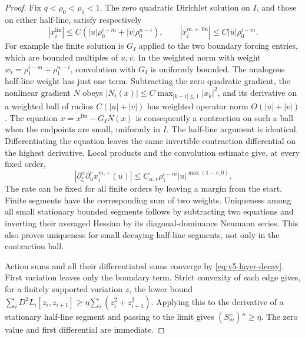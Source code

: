 \begin{proof}
Fix $q<\rho_0<\rho_1<1$. The zero quadratic Dirichlet solution on
$I$, and those on either half-line, satisfy respectively
\[
 |x_i^{\mathrm{lin}}|\le C(|u|\rho_0^{i-m}+|v|\rho_0^{n-i}),
 \qquad |x_i^{m,+,\mathrm{lin}}|\le C|u|\rho_0^{i-m}.
\]
For example the finite solution is $G_I$ applied to the two boundary
forcing entries, which are bounded multiples of $u,v$.
In the weighted norm with weight
$w_i=\rho_1^{i-m}+\rho_1^{n-i}$, convolution with $G_I$ is uniformly
bounded. The analogous half-line weight has just one term. Subtracting
the zero quadratic gradient, the nonlinear gradient $N$ obeys
$|N_i(x)|\le C\max_{|k-i|\le1}|x_k|^2$, and its derivative on a
weighted ball of radius $C(|u|+|v|)$ has weighted operator norm
$O(|u|+|v|)$. The equation
$x=x^{\mathrm{lin}}-G_I N(x)$ is consequently a contraction on such
a ball when the endpoints are small, uniformly in $I$. The half-line
argument is identical. Differentiating the equation leaves the same
invertible contraction differential on the highest derivative.
Local products and the convolution estimate give, at every fixed order,
\begin{equation}\label{eq:v5-layer-decay}
 |\partial_\xi^\alpha\partial_u^r x_i^{m,+}(u)|
 \le C_{\alpha,r}\rho_1^{i-m}|u|^{\max(1-r,0)}.
\end{equation}
The rate can be fixed for all finite orders by leaving a margin from
the start. Finite segments have the corresponding sum of two weights.
Uniqueness among all small stationary bounded segments follows by
subtracting two equations and inverting their averaged Hessian by
its diagonal-dominance Neumann series. This also proves uniqueness for
small decaying half-line segments, not only in the contraction ball.

Action sums and all their differentiated sums converge by
\eqref{eq:v5-layer-decay}. First variation leaves only the boundary
term. Strict convexity of each edge gives, for a finitely supported
variation $z$, the lower bound
$\sum_i D^2L_i[z_i,z_{i+1}]\ge
\eta\sum_i(z_i^2+z_{i+1}^2)$.
Applying this to the derivative of a stationary half-line segment and
passing to the limit gives $(S_m^\pm)''\ge\eta$. The zero value and
first differential are immediate.


\end{proof}
